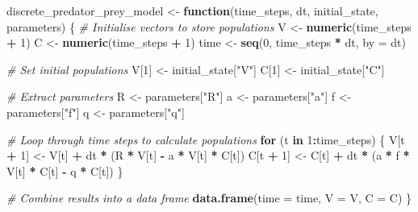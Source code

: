 \documentclass[
  a4paper]{book}
\newenvironment{Shaded}{\begin{snugshade}}{\end{snugshade}}
\newcommand{\AttributeTok}[1]{\textcolor[rgb]{0.13,0.29,0.53}{#1}}
\newcommand{\CommentTok}[1]{\textcolor[rgb]{0.56,0.35,0.01}{\textit{#1}}}
\newcommand{\ControlFlowTok}[1]{\textcolor[rgb]{0.13,0.29,0.53}{\textbf{#1}}}
\newcommand{\DecValTok}[1]{\textcolor[rgb]{0.00,0.00,0.81}{#1}}
\newcommand{\FunctionTok}[1]{\textcolor[rgb]{0.13,0.29,0.53}{\textbf{#1}}}
\newcommand{\NormalTok}[1]{#1}
\newcommand{\OtherTok}[1]{\textcolor[rgb]{0.56,0.35,0.01}{#1}}
\newcommand{\SpecialCharTok}[1]{\textcolor[rgb]{0.81,0.36,0.00}{\textbf{#1}}}
\newcommand{\StringTok}[1]{\textcolor[rgb]{0.31,0.60,0.02}{#1}}
\begin{document}
\begin{Shaded}
\begin{Highlighting}[]
\NormalTok{discrete\_predator\_prey\_model }\OtherTok{\textless{}{-}} \ControlFlowTok{function}\NormalTok{(time\_steps, dt, initial\_state, parameters) \{}
  \CommentTok{\# Initialise vectors to store populations}
\NormalTok{  V }\OtherTok{\textless{}{-}} \FunctionTok{numeric}\NormalTok{(time\_steps }\SpecialCharTok{+} \DecValTok{1}\NormalTok{)}
\NormalTok{  C }\OtherTok{\textless{}{-}} \FunctionTok{numeric}\NormalTok{(time\_steps }\SpecialCharTok{+} \DecValTok{1}\NormalTok{)}
\NormalTok{  time }\OtherTok{\textless{}{-}} \FunctionTok{seq}\NormalTok{(}\DecValTok{0}\NormalTok{, time\_steps }\SpecialCharTok{*}\NormalTok{ dt, }\AttributeTok{by =}\NormalTok{ dt)}
  
  \CommentTok{\# Set initial populations}
\NormalTok{  V[}\DecValTok{1}\NormalTok{] }\OtherTok{\textless{}{-}}\NormalTok{ initial\_state[}\StringTok{"V"}\NormalTok{]}
\NormalTok{  C[}\DecValTok{1}\NormalTok{] }\OtherTok{\textless{}{-}}\NormalTok{ initial\_state[}\StringTok{"C"}\NormalTok{]}
  
  \CommentTok{\# Extract parameters}
\NormalTok{  R }\OtherTok{\textless{}{-}}\NormalTok{ parameters[}\StringTok{"R"}\NormalTok{]}
\NormalTok{  a }\OtherTok{\textless{}{-}}\NormalTok{ parameters[}\StringTok{"a"}\NormalTok{]}
\NormalTok{  f }\OtherTok{\textless{}{-}}\NormalTok{ parameters[}\StringTok{"f"}\NormalTok{]}
\NormalTok{  q }\OtherTok{\textless{}{-}}\NormalTok{ parameters[}\StringTok{"q"}\NormalTok{]}
  
  \CommentTok{\# Loop through time steps to calculate populations}
  \ControlFlowTok{for}\NormalTok{ (t }\ControlFlowTok{in} \DecValTok{1}\SpecialCharTok{:}\NormalTok{time\_steps) \{}
\NormalTok{    V[t }\SpecialCharTok{+} \DecValTok{1}\NormalTok{] }\OtherTok{\textless{}{-}}\NormalTok{ V[t] }\SpecialCharTok{+}\NormalTok{ dt }\SpecialCharTok{*}\NormalTok{ (R }\SpecialCharTok{*}\NormalTok{ V[t] }\SpecialCharTok{{-}}\NormalTok{ a }\SpecialCharTok{*}\NormalTok{ V[t] }\SpecialCharTok{*}\NormalTok{ C[t])}
\NormalTok{    C[t }\SpecialCharTok{+} \DecValTok{1}\NormalTok{] }\OtherTok{\textless{}{-}}\NormalTok{ C[t] }\SpecialCharTok{+}\NormalTok{ dt }\SpecialCharTok{*}\NormalTok{ (a }\SpecialCharTok{*}\NormalTok{ f }\SpecialCharTok{*}\NormalTok{ V[t] }\SpecialCharTok{*}\NormalTok{ C[t] }\SpecialCharTok{{-}}\NormalTok{ q }\SpecialCharTok{*}\NormalTok{ C[t])}
\NormalTok{  \}}
  
  \CommentTok{\# Combine results into a data frame}
  \FunctionTok{data.frame}\NormalTok{(}\AttributeTok{time =}\NormalTok{ time, }\AttributeTok{V =}\NormalTok{ V, }\AttributeTok{C =}\NormalTok{ C)}
\NormalTok{\}}
\end{Highlighting}
\end{Shaded}
\end{document}
